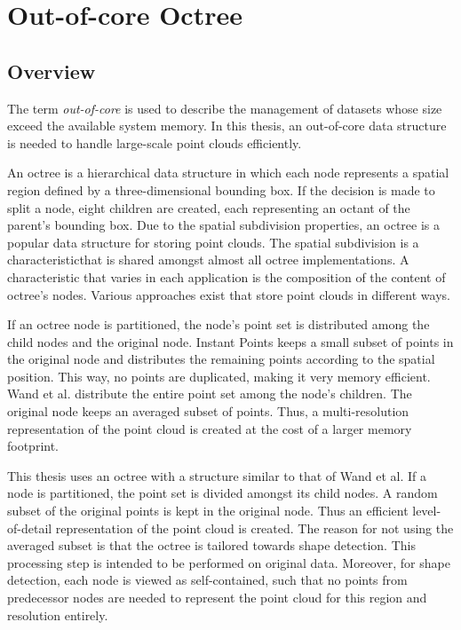 \chapter{Out-of-core Octree}
\label{chap:octree}


\section{Overview}

The term \textit{out-of-core} is used to describe the management of datasets whose size exceed the available system memory. In this thesis, an out-of-core data structure is needed to handle large-scale point clouds efficiently. 

An octree is a hierarchical data structure in which each node represents a spatial region defined by a three-dimensional bounding box. If the decision is made to split a node, eight children are created, each representing an octant of the parent's bounding box. Due to the spatial subdivision properties, an octree is a popular data structure for storing point clouds. The spatial subdivision is a characteristicthat is shared amongst almost all octree implementations. A characteristic that varies in each application is the composition of the content of octree's nodes. Various approaches exist that store point clouds in different ways. 

If an octree node is partitioned, the node's point set is distributed among the child nodes and the original node. 
Instant Points \cite{wimmer2006instant} keeps a small subset of points in the original node and distributes the remaining points according to the spatial position. This way, no points are duplicated, making it very memory efficient. 
Wand et al. \cite{wand2007interactive} distribute the entire point set among the node's children. The original node keeps an averaged subset of points. Thus, a multi-resolution representation of the point cloud is created at the cost of a larger memory footprint. 

This thesis uses an octree with a structure similar to that of Wand et al. If a node is partitioned, the point set is divided amongst its child nodes. A random subset of the original points is kept in the original node. Thus an efficient level-of-detail representation of the point cloud is created. 
The reason for not using the averaged subset is that the octree is tailored towards shape detection. This processing step is intended to be performed on original data. Moreover, for shape detection, each node is viewed as self-contained, such that no points from predecessor nodes are needed to represent the point cloud for this region and resolution entirely. 

